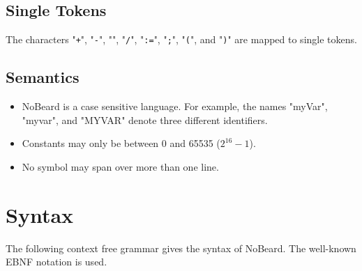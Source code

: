 \documentclass[11pt]{report}
\newcommand{\leongage}{NoBeard}
\begin{document}
\subsection{Single Tokens}
The characters "{\tt+}", "{\tt-}", "{\tt*}", "{\tt/}", "{\tt:=}", "{\tt;}", "{\tt(}", and "{\tt)}" are mapped to single tokens.

\subsection{Semantics}
\begin{itemize}
	\item \leongage{} is a case sensitive language. For example, the names "myVar", "myvar", and "MYVAR" denote three different identifiers.
	\item Constants may only be between 0 and 65535 ($2^{16} - 1$).
	\item No symbol may span over more than one line.
\end{itemize}

\section{Syntax}
The following context free grammar gives the syntax of \leongage{}. The well-known EBNF notation is used.
\end{document}
